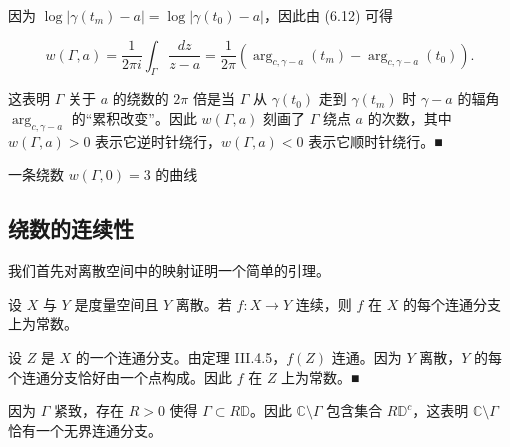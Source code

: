 \begin{remark}
\begin{items}
因为 $ \log|\gamma(t_{m}) - a| = \log|\gamma(t_{0}) - a| $，因此由 (6.12) 可得

\[
w(\Gamma,a) = \frac{1}{2\pi i}\int_{\Gamma}\frac{dz}{z - a} = \frac{1}{2\pi}\left(\arg_{c,\gamma-a}(t_{m}) - \arg_{c,\gamma-a}(t_{0})\right) .
\]

这表明 $ \Gamma $ 关于 $ a $ 的绕数的 $ 2\pi $ 倍是当 $ \Gamma $ 从 $ \gamma(t_{0}) $ 走到 $ \gamma(t_{m}) $ 时 $ \gamma - a $ 的辐角 $ \arg_{c,\gamma-a} $ 的“累积改变”。因此 $ w(\Gamma,a) $ 刻画了 $ \Gamma $ 绕点 $ a $ 的次数，其中 $ w(\Gamma,a) > 0 $ 表示它逆时针绕行，$ w(\Gamma,a) < 0 $ 表示它顺时针绕行。\nobreak\hspace{0.35em}■

\end{items}


一条绕数 $ w(\Gamma,0) = 3 $ 的曲线

\end{remark}

\subsection*{绕数的连续性}

我们首先对离散空间中的映射证明一个简单的引理。

\begin{lemma}

设 $ X $ 与 $ Y $ 是度量空间且 $ Y $ 离散。若 $ f : X \to Y $ 连续，则 $ f $ 在 $ X $ 的每个连通分支上为常数。

\proofhead
设 $ Z $ 是 $ X $ 的一个连通分支。由定理 III.4.5，$ f(Z) $ 连通。因为 $ Y $ 离散，$ Y $ 的每个连通分支恰好由一个点构成。因此 $ f $ 在 $ Z $ 上为常数。\nobreak\hspace{0.35em}■
\end{lemma}

因为 $ \Gamma $ 紧致，存在 $ R > 0 $ 使得 $ \Gamma \subset R\mathbb{D} $。因此 $ \mathbb{C}\setminus\Gamma $ 包含集合 $ R\mathbb{D}^{c} $，这表明 $ \mathbb{C}\setminus\Gamma $ 恰有一个无界连通分支。

